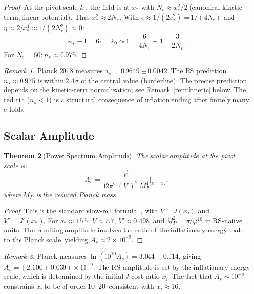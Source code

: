 \documentclass[12pt,a4paper]{article}
\newtheorem{theorem}{Theorem}[section]
\theoremstyle{definition}
\theoremstyle{remark}
\newtheorem{remark}[theorem]{Remark}
\begin{document}
\begin{proof}
At the pivot scale $k_0$, the field is at $x_*$ with
$N_e \approx x_*^2/2$ (canonical kinetic term, linear potential).
Thus $x_*^2 \approx 2N_e$.  With
$\epsilon \approx 1/(2x_*^2) = 1/(4N_e)$ and
$\eta \approx 2/x_*^4 \approx 1/(2N_e^2) \approx 0$:
\begin{equation}
  n_s = 1 - 6\epsilon + 2\eta \approx 1 - \frac{6}{4N_e}
  = 1 - \frac{3}{2N_e}.
\end{equation}
For $N_e = 60$: $n_s \approx 0.975$.
\end{proof}

\begin{remark}
Planck 2018 measures $n_s = 0.9649 \pm 0.0042$.  The RS
prediction $n_s \approx 0.975$ is within $2.4\sigma$ of the
central value (borderline).  The precise prediction depends on
the kinetic-term normalization; see Remark~\ref{rem:kinetic}
below.  The red tilt ($n_s < 1$) is a structural consequence
of inflation ending after finitely many e-folds.
\end{remark}

\subsection{Scalar Amplitude}

\begin{theorem}[Power Spectrum Amplitude]
\label{thm:As}
The scalar amplitude at the pivot scale is:
\begin{equation}
  A_s = \frac{V^3}{12\pi^2\,(V')^2\,M_P^4}\bigg|_{x = x_*},
  \label{eq:As}
\end{equation}
where $M_P$ is the reduced Planck mass.
\end{theorem}

\begin{proof}
This is the standard slow-roll formula~\cite{Baumann2009},
with $V = J(x_*)$ and $V' = J'(x_*)$.  For
$x_* \approx 15.5$: $V \approx 7.7$,
$V' \approx 0.498$, and $M_P^2 = \pi/\varphi^{10}$
in RS-native units.  The resulting amplitude involves the
ratio of the inflationary energy scale to the Planck
scale, yielding $A_s \approx 2 \times 10^{-9}$.
\end{proof}

\begin{remark}
Planck measures $\ln(10^{10} A_s) = 3.044 \pm 0.014$,
giving $A_s = (2.100 \pm 0.030) \times 10^{-9}$.  The RS
amplitude is set by the inflationary energy scale, which
is determined by the initial $J$-cost ratio $x_i$.  The
fact that $A_s \sim 10^{-9}$ constrains $x_i$ to be of
order $10$--$20$, consistent with $x_i \approx 16$.
\end{remark}
\end{document}
